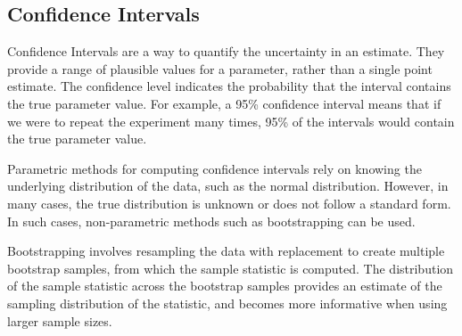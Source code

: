 



\subsection*{Confidence Intervals}
Confidence Intervals are a way to quantify the uncertainty in an estimate. They provide a range of plausible values for a parameter, rather than a single point estimate. The confidence level indicates the probability that the interval contains the true parameter value. For example, a 95\% confidence interval means that if we were to repeat the experiment many times, 95\% of the intervals would contain the true parameter value.

Parametric methods for computing confidence intervals rely on knowing the underlying distribution of the data, such as the normal distribution. However, in many cases, the true distribution is unknown or does not follow a standard form. In such cases, non-parametric methods such as bootstrapping can be used.

Bootstrapping involves resampling the data with replacement to create multiple bootstrap samples, from which the sample statistic is computed. The distribution of the sample statistic across the bootstrap samples provides an estimate of the sampling distribution of the statistic, and becomes more informative when using larger sample sizes.

